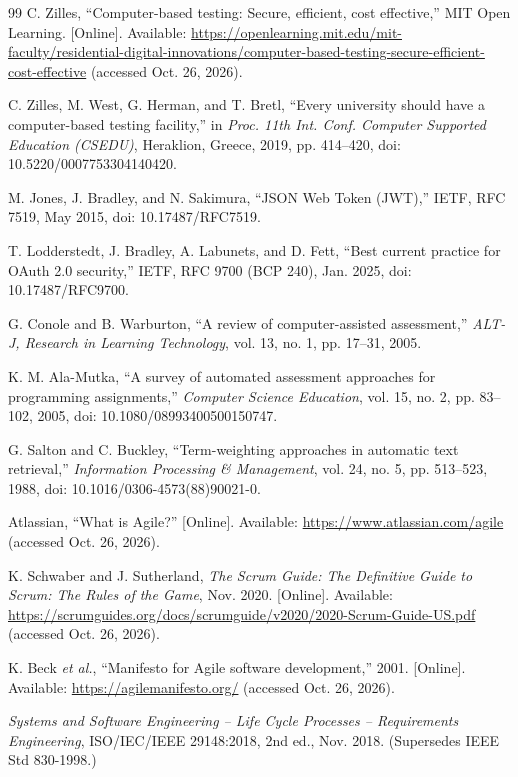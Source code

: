 \begin{thebibliography}{99}
 C. Zilles, ``Computer-based testing: Secure, efficient, cost effective,'' MIT Open Learning. [Online]. Available: \url{https://openlearning.mit.edu/mit-faculty/residential-digital-innovations/computer-based-testing-secure-efficient-cost-effective} (accessed Oct. 26, 2026).

 C. Zilles, M. West, G. Herman, and T. Bretl, ``Every university should have a computer-based testing facility,'' in \textit{Proc. 11th Int. Conf. Computer Supported Education (CSEDU)}, Heraklion, Greece, 2019, pp. 414--420, doi: 10.5220/0007753304140420.

 M. Jones, J. Bradley, and N. Sakimura, ``JSON Web Token (JWT),'' IETF, RFC 7519, May 2015, doi: 10.17487/RFC7519.

 T. Lodderstedt, J. Bradley, A. Labunets, and D. Fett, ``Best current practice for OAuth 2.0 security,'' IETF, RFC 9700 (BCP 240), Jan. 2025, doi: 10.17487/RFC9700.

 G. Conole and B. Warburton, ``A review of computer-assisted assessment,'' \textit{ALT-J, Research in Learning Technology}, vol. 13, no. 1, pp. 17--31, 2005.

 K. M. Ala-Mutka, ``A survey of automated assessment approaches for programming assignments,'' \textit{Computer Science Education}, vol. 15, no. 2, pp. 83--102, 2005, doi: 10.1080/08993400500150747.

 G. Salton and C. Buckley, ``Term-weighting approaches in automatic text retrieval,'' \textit{Information Processing \& Management}, vol. 24, no. 5, pp. 513--523, 1988, doi: 10.1016/0306-4573(88)90021-0.

 Atlassian, ``What is Agile?'' [Online]. Available: \url{https://www.atlassian.com/agile} (accessed Oct. 26, 2026).

 K. Schwaber and J. Sutherland, \textit{The Scrum Guide: The Definitive Guide to Scrum: The Rules of the Game}, Nov. 2020. [Online]. Available: \url{https://scrumguides.org/docs/scrumguide/v2020/2020-Scrum-Guide-US.pdf} (accessed Oct. 26, 2026).

 K. Beck \textit{et al.}, ``Manifesto for Agile software development,'' 2001. [Online]. Available: \url{https://agilemanifesto.org/} (accessed Oct. 26, 2026).

 \textit{Systems and Software Engineering -- Life Cycle Processes -- Requirements Engineering}, ISO/IEC/IEEE 29148:2018, 2nd ed., Nov. 2018. (Supersedes IEEE Std 830-1998.)


\end{thebibliography}
